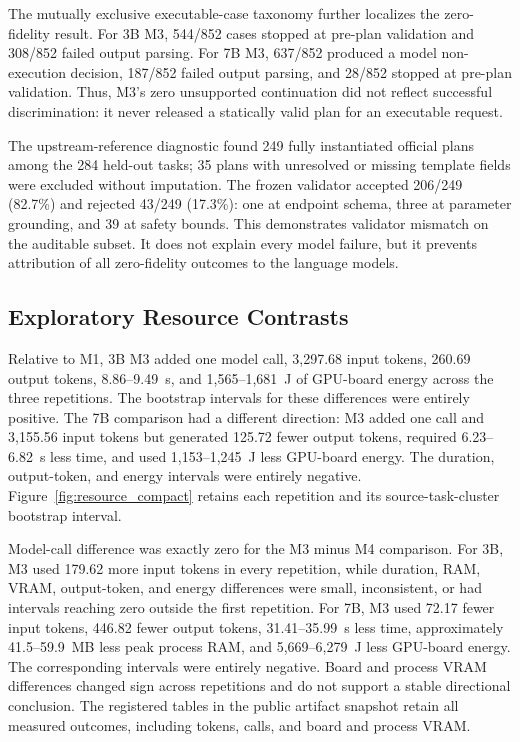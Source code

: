 \documentclass[conference]{IEEEtran}
\newcommand{\Mone}{\textsc{M1}\xspace}
\newcommand{\Mthree}{\textsc{M3}\xspace}
\newcommand{\Mfour}{\textsc{M4}\xspace}
\begin{document}
The mutually exclusive executable-case taxonomy further localizes the zero-
fidelity result. For 3B \Mthree, 544/852 cases stopped at pre-plan validation
and 308/852 failed output parsing. For 7B \Mthree, 637/852 produced a model
non-execution decision, 187/852 failed output parsing, and 28/852 stopped at
pre-plan validation. Thus, \Mthree's zero unsupported continuation did not
reflect successful discrimination: it never released a statically valid plan
for an executable request.

The upstream-reference diagnostic found 249 fully instantiated official plans
among the 284 held-out tasks; 35 plans with unresolved or missing template
fields were excluded without imputation. The frozen validator accepted
206/249 (82.7\%) and rejected 43/249 (17.3\%): one at endpoint schema, three at
parameter grounding, and 39 at safety bounds. This demonstrates validator
mismatch on the auditable subset. It does not explain every model failure, but
it prevents attribution of all zero-fidelity outcomes to the language models.

\subsection{Exploratory Resource Contrasts}

Relative to \Mone, 3B \Mthree added one model call, 3,297.68 input tokens,
260.69 output tokens, 8.86--9.49~s, and 1,565--1,681~J of GPU-board energy
across the three repetitions. The bootstrap intervals for these differences
were entirely positive. The 7B comparison had a different direction:
\Mthree added one call and 3,155.56 input tokens but generated 125.72 fewer
output tokens, required 6.23--6.82~s less time, and used 1,153--1,245~J less
GPU-board energy. The duration, output-token, and energy intervals were
entirely negative. Figure~\ref{fig:resource_compact} retains each repetition
and its source-task-cluster bootstrap interval.

Model-call difference was exactly zero for the \Mthree{} minus \Mfour
comparison. For 3B, \Mthree used 179.62 more input tokens in every repetition,
while duration, RAM, VRAM, output-token, and energy differences were small,
inconsistent, or had intervals reaching zero outside the first repetition. For
7B, \Mthree used 72.17 fewer input tokens, 446.82 fewer output tokens,
31.41--35.99~s less time, approximately 41.5--59.9~MB less peak process RAM,
and 5,669--6,279~J less GPU-board energy. The corresponding intervals were
entirely negative. Board and process VRAM differences changed sign across
repetitions and do not support a stable directional conclusion. The registered
tables in the public artifact snapshot retain all measured outcomes, including
tokens, calls, and board and process VRAM.
\end{document}
